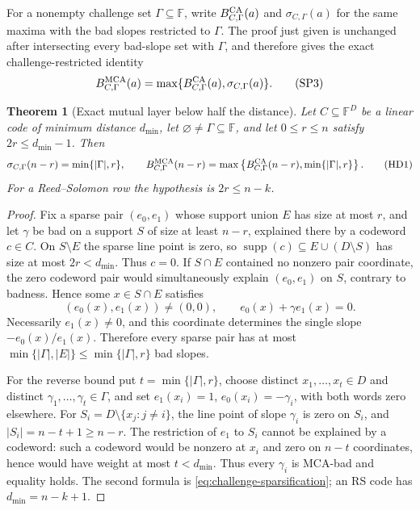 \documentclass[11pt,a4paper]{amsart}
\numberwithin{equation}{section}
\newtheorem{theorem}{Theorem}[section]
\theoremstyle{remark}
\DeclareMathOperator{\supp}{supp}
\newcommand{\F}{\mathbb F}
\newcommand{\abs}[1]{\lvert #1\rvert}
\begin{document}
For a nonempty challenge set \(\Gamma\subseteq\F\), write
\(B_{C,\Gamma}^{\rm CA}(a)\) and \(\sigma_{C,\Gamma}(a)\) for the same
maxima with the bad slopes restricted to \(\Gamma\).  The proof just given
is unchanged after intersecting every bad-slope set with \(\Gamma\), and
therefore gives the exact challenge-restricted identity
\[
 B_{C,\Gamma}^{\rm MCA}(a)
 =\max\{B_{C,\Gamma}^{\rm CA}(a),\sigma_{C,\Gamma}(a)\}.
 \tag{SP3}\label{eq:challenge-sparsification}
\]

\begin{theorem}[Exact mutual layer below half the distance]
\label{thm:exact-half-distance-sparse}
Let \(C\subseteq\F^D\) be a linear code of minimum distance
\(d_{\min}\), let \(\varnothing\ne\Gamma\subseteq\F\), and let
\(0\le r\le n\) satisfy \(2r\le d_{\min}-1\).  Then
\[
 \sigma_{C,\Gamma}(n-r)=\min\{\abs\Gamma,r\},
 \qquad
 B_{C,\Gamma}^{\rm MCA}(n-r)
 =\max\left\{B_{C,\Gamma}^{\rm CA}(n-r),
              \min\{\abs\Gamma,r\}\right\}.       \tag{HD1}
\label{eq:exact-half-distance-sparse}
\]
For a Reed--Solomon row the hypothesis is \(2r\le n-k\).
\end{theorem}

\begin{proof}
Fix a sparse pair \((e_0,e_1)\) whose support union \(E\) has size at
most \(r\), and let \(\gamma\) be bad on a support \(S\) of size at least
\(n-r\), explained there by a codeword \(c\in C\).  On \(S\setminus E\)
the sparse line point is zero, so
\(\supp(c)\subseteq E\cup(D\setminus S)\) has size at most \(2r<d_{\min}\).
Thus \(c=0\).  If \(S\cap E\) contained no nonzero pair coordinate, the
zero codeword pair would simultaneously explain \((e_0,e_1)\) on \(S\),
contrary to badness.  Hence some \(x\in S\cap E\) satisfies
\[
 (e_0(x),e_1(x))\ne(0,0),\qquad e_0(x)+\gamma e_1(x)=0.
\]
Necessarily \(e_1(x)\ne0\), and this coordinate determines the single
slope \(-e_0(x)/e_1(x)\).  Therefore every sparse pair has at most
\(\min\{\abs\Gamma,\abs E\}\le\min\{\abs\Gamma,r\}\) bad slopes.

For the reverse bound put \(t=\min\{\abs\Gamma,r\}\), choose distinct
\(x_1,\ldots,x_t\in D\) and distinct
\(\gamma_1,\ldots,\gamma_t\in\Gamma\), and set
\(e_1(x_i)=1\), \(e_0(x_i)=-\gamma_i\), with both words zero elsewhere.
For \(S_i=D\setminus\{x_j:j\ne i\}\), the line point of slope
\(\gamma_i\) is zero on \(S_i\), and
\(\abs{S_i}=n-t+1\ge n-r\).  The restriction of \(e_1\) to \(S_i\)
cannot be explained by a codeword: such a codeword would be nonzero at
\(x_i\) and zero on \(n-t\) coordinates, hence would have weight at most
\(t<d_{\min}\).  Thus every \(\gamma_i\) is MCA-bad and equality holds.
The second formula is \eqref{eq:challenge-sparsification}; an RS code has
\(d_{\min}=n-k+1\).
\end{proof}
\end{document}
